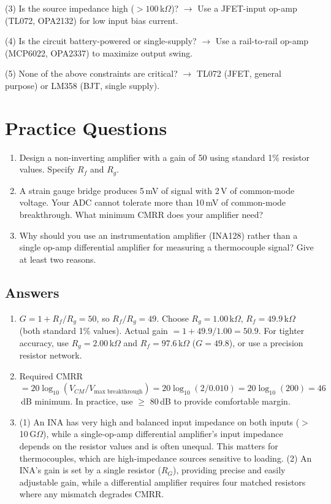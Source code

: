 \documentclass[11pt,letterpaper,twoside,openany]{book}
\begin{document}
(3) Is the source impedance high ($> 100$\,k$\Omega$)? $\to$ Use a JFET-input op-amp (TL072, OPA2132) for low input bias current.

(4) Is the circuit battery-powered or single-supply? $\to$ Use a rail-to-rail op-amp (MCP6022, OPA2337) to maximize output swing.

(5) None of the above constraints are critical? $\to$ TL072 (JFET, general purpose) or LM358 (BJT, single supply).
\section{Practice Questions}
\begin{enumerate}[leftmargin=1.5em]
\item Design a non-inverting amplifier with a gain of 50 using standard 1\% resistor values. Specify $R_f$ and $R_g$.
\item A strain gauge bridge produces 5\,mV of signal with 2\,V of common-mode voltage. Your ADC cannot tolerate more than 10\,mV of common-mode breakthrough. What minimum CMRR does your amplifier need?
\item Why should you use an instrumentation amplifier (INA128) rather than a single op-amp differential amplifier for measuring a thermocouple signal? Give at least two reasons.
\end{enumerate}

\subsection{Answers}
\begin{enumerate}[leftmargin=1.5em]
\item $G = 1 + R_f/R_g = 50$, so $R_f/R_g = 49$. Choose $R_g = 1.00$\,k$\Omega$, $R_f = 49.9$\,k$\Omega$ (both standard 1\% values). Actual gain $= 1 + 49.9/1.00 = 50.9$. For tighter accuracy, use $R_g = 2.00$\,k$\Omega$ and $R_f = 97.6$\,k$\Omega$ ($G = 49.8$), or use a precision resistor network.
\item Required CMRR $= 20\log_{10}(V_{CM} / V_{\text{max breakthrough}}) = 20\log_{10}(2/0.010) = 20\log_{10}(200) = 46$\,dB minimum. In practice, use $\geq$ 80\,dB to provide comfortable margin.
\item (1) An INA has very high and balanced input impedance on both inputs ($>$10\,G$\Omega$), while a single-op-amp differential amplifier's input impedance depends on the resistor values and is often unequal. This matters for thermocouples, which are high-impedance sources sensitive to loading. (2) An INA's gain is set by a single resistor ($R_G$), providing precise and easily adjustable gain, while a differential amplifier requires four matched resistors where any mismatch degrades CMRR.
\end{enumerate}
\end{document}
